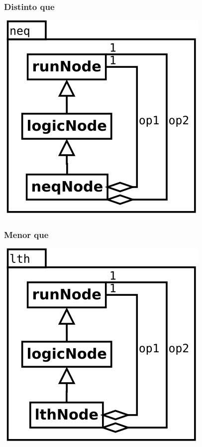 \subsubsection {Distinto que}
\begin{center}
\includegraphics[scale=0.4]{neq.png} \\
\end{center}

\subsubsection {Menor que}
\begin{center}
\includegraphics[scale=0.4]{lth.png} \\
\end{center}

